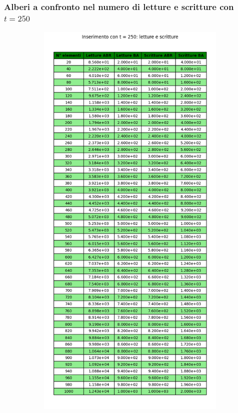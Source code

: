 \subsubsection{Alberi a confronto nel numero di letture e scritture con $t = 250$}


\begin{figure}[H]
    \centering
    \begin{subfigure}[b]{0.49\textwidth}
        \centering
        \includegraphics[width=\textwidth]{tables/insert-wr-t250.png}

\end{subfigure}
\end{figure}
